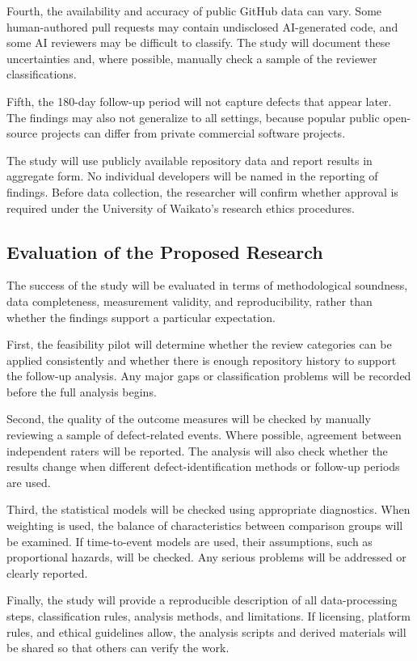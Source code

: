 \documentclass[stu,12pt,donotrepeattitle]{apa7}
\begin{document}
Fourth, the availability and accuracy of public GitHub data can vary. Some human-authored pull requests may contain undisclosed AI-generated code, and some AI reviewers may be difficult to classify. The study will document these uncertainties and, where possible, manually check a sample of the reviewer classifications.

Fifth, the 180-day follow-up period will not capture defects that appear later. The findings may also not generalize to all settings, because popular public open-source projects can differ from private commercial software projects.

The study will use publicly available repository data and report results in aggregate form. No individual developers will be named in the reporting of findings. Before data collection, the researcher will confirm whether approval is required under the University of Waikato's research ethics procedures.

\subsection{Evaluation of the Proposed Research}

The success of the study will be evaluated in terms of methodological soundness, data completeness, measurement validity, and reproducibility, rather than whether the findings support a particular expectation.

First, the feasibility pilot will determine whether the review categories can be applied consistently and whether there is enough repository history to support the follow-up analysis. Any major gaps or classification problems will be recorded before the full analysis begins.

Second, the quality of the outcome measures will be checked by manually reviewing a sample of defect-related events. Where possible, agreement between independent raters will be reported. The analysis will also check whether the results change when different defect-identification methods or follow-up periods are used.

Third, the statistical models will be checked using appropriate diagnostics. When weighting is used, the balance of characteristics between comparison groups will be examined. If time-to-event models are used, their assumptions, such as proportional hazards, will be checked. Any serious problems will be addressed or clearly reported.

Finally, the study will provide a reproducible description of all data-processing steps, classification rules, analysis methods, and limitations. If licensing, platform rules, and ethical guidelines allow, the analysis scripts and derived materials will be shared so that others can verify the work.
\end{document}
